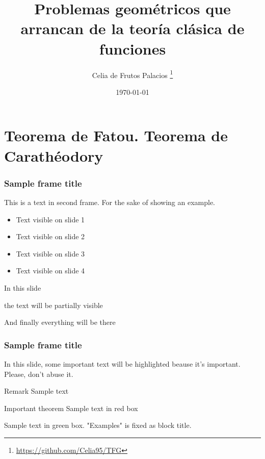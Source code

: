 \documentclass[spanish, a4paper, 12pt, final, slideColor, nototal, colorBG, pdf, noaccumulate, darkblue]{beamer}
\title{Problemas geométricos que arrancan de la teoría clásica de funciones}
\author{Celia de Frutos Palacios \thanks{\url{https://github.com/Celia95/TFG}}}
\subtitle{}
\institute[UCM]{}
\date{\today}
\begin{document}
\maketitle



\section{Teorema de Fatou. Teorema de Carathéodory}

\begin{frame}
\frametitle{Sample frame title}
This is a text in second frame.
For the sake of showing an example.

\begin{itemize}
    \item<1-> Text visible on slide 1
    \item<2-> Text visible on slide 2
    \item<3> Text visible on slide 3
    \item<4-> Text visible on slide 4
\end{itemize}

\end{frame}

\begin{frame}
In this slide \pause

the text will be partially visible \pause

And finally everything will be there
\end{frame}


\begin{frame}
    \frametitle{Sample frame title}

    In this slide, some important text will be \alert{highlighted} beause it's important. Please, don't abuse it.

    \begin{block}{Remark}
        Sample text
    \end{block}

    \begin{alertblock}{Important theorem}
        Sample text in red box
    \end{alertblock}

    \begin{examples}
        Sample text in green box. "Examples" is fixed as block title.
    \end{examples}
\end{frame}
\end{document}
